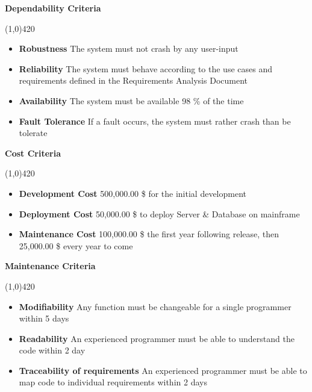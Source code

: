 \vspace{0.5cm}

\textbf{Dependability Criteria}
\vspace{-1.1cm}
\begin{center}
\line(1,0){420}
\end{center}
\begin{itemize}
\item \textbf{Robustness} The system must not crash by any user-input
\item \textbf{Reliability} The system must behave according to the use cases and requirements defined in the Requirements Analysis Document
\item \textbf{Availability} The system must be available 98 \% of the time
\item \textbf{Fault Tolerance} If a fault occurs, the system must rather crash than be tolerate
\end{itemize}



\textbf{Cost Criteria}
\vspace{-1.1cm}
\begin{center}
\line(1,0){420}
\end{center}
\begin{itemize}
\item \textbf{Development Cost}  500,000.00 \$ for the initial development
\item \textbf{Deployment Cost}  50,000.00 \$ to deploy Server \& Database on mainframe
\item \textbf{Maintenance Cost}  100,000.00 \$ the first year following release, then 25,000.00 \$ every year to come
\end{itemize}

\vspace{0.5cm}

\textbf{Maintenance Criteria}
\vspace{-1.1cm}
\begin{center}
\line(1,0){420}
\end{center}
\begin{itemize}
\item \textbf{Modifiability} Any function must be changeable for a single programmer within 5 days
\item \textbf{Readability} An experienced programmer must be able to understand the code within 2 day
\item \textbf{Traceability of requirements} An experienced programmer must be able to map code to individual requirements within 2 days
\end{itemize}

